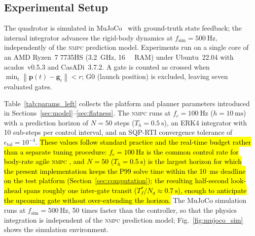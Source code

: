 \documentclass{ieeeaccess}
\newcommand{\hlt}[1]{\hl{#1}}
\newcommand{\norm}[1]{\left\| #1 \right\|}
\newcommand{\vect}[1]{\bm{#1}}
\newcommand{\nmpc}{\textsc{nmpc}}
\newcommand{\mujoco}{MuJoCo}
\begin{document}
\subsection{Experimental Setup}
\label{sec:setup}

The quadrotor is simulated in \mujoco{}~\cite{todorov2012mujoco} with
ground-truth state feedback; the internal integrator advances the
rigid-body dynamics at $f_\text{sim}=\SI{500}{\hertz}$, independently
of the \nmpc{} prediction model.
Experiments run on a single core of an AMD Ryzen~7 7735HS
(\SI{3.2}{\giga\hertz}, \SI{16}{\giga\byte} RAM) under Ubuntu~22.04
with acados~v0.5.3 and CasADi~3.7.2.
A gate is counted as crossed when
$\min_t\norm{\vect{p}(t)-\vect{g}_i}<r$; G0 (launch position) is
excluded, leaving seven evaluated gates.

Table~\ref{tab:params_left} collects the platform and planner
parameters introduced in Sections~\ref{sec:model}--\ref{sec:flatness}.
The \nmpc{} runs at $f_c=\SI{100}{\hertz}$ ($h=\SI{10}{\milli\second}$)
with a prediction horizon of $N=50$ steps ($T_h=\SI{0.5}{\s}$), an
ERK4 integrator with 10 sub-steps per control interval, and an
SQP-RTI convergence tolerance of $\epsilon_\text{tol}=10^{-4}$.
\hlt{These values follow standard practice and the real-time budget
rather than a separate tuning procedure: \mbox{$f_c=\SI{100}{\hertz}$}
is the common control rate for body-rate agile \mbox{\nmpc{}}
\mbox{\cite{hanover2021performance,verschueren2022acados}}, and
\mbox{$N=50$} (\mbox{$T_h=\SI{0.5}{\s}$}) is the largest horizon for
which the present implementation keeps the P99 solve time within the
\mbox{\SI{10}{\milli\second}} deadline on the test platform
(Section~\mbox{\ref{sec:computation}}); the resulting half-second
look-ahead spans roughly one inter-gate transit
(\mbox{$T_f^*/N_g\!\approx\!\SI{0.7}{\s}$}), enough to anticipate the
upcoming gate without over-extending the horizon.}
The \mujoco{} simulation runs at $f_\text{sim}=\SI{500}{\hertz}$,
50 times faster than the controller, so that the physics integration
is independent of the \nmpc{} prediction model;
Fig.~\ref{fig:mujoco_sim} shows the simulation environment.
\end{document}
